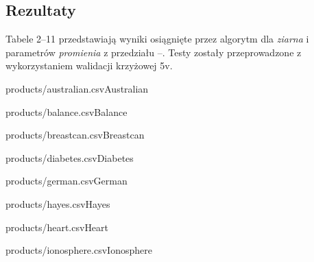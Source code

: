 \documentclass[]{article}
\begin{document}
\subsection{Rezultaty}

Tabele 2--11 przedstawiają wyniki osiągnięte przez algorytm dla \emph{ziarna}  i parametrów \emph{promienia} z przedziału --. Testy zostały przeprowadzone z wykorzystaniem walidacji krzyżowej \oldstylenums5v.

\begin{table}[htb]
    \parbox{.45\linewidth}{
	    \begin{ride}{products/australian.csv}{Australian}\end{ride}
	}
	\hfill
    \parbox{.45\linewidth}{
	    \begin{ride}{products/balance.csv}{Balance}\end{ride}
	}
\end{table}

\begin{table}[!ht]
    \parbox{.45\linewidth}{
	    \begin{ride}{products/breastcan.csv}{Breastcan}\end{ride}
	}
	\hfill
    \parbox{.45\linewidth}{
	    \begin{ride}{products/diabetes.csv}{Diabetes}\end{ride}
	}
\end{table}


\begin{table}[!ht]
    \parbox{.45\linewidth}{
	    \begin{ride}{products/german.csv}{German}\end{ride}
	}
	\hfill
    \parbox{.45\linewidth}{
	    \begin{ride}{products/hayes.csv}{Hayes}\end{ride}
	}
\end{table}

\begin{table}[!ht]
    \parbox{.45\linewidth}{
	    \begin{ride}{products/heart.csv}{Heart}\end{ride}
	}
	\hfill
    \parbox{.45\linewidth}{
	    \begin{ride}{products/ionosphere.csv}{Ionosphere}\end{ride}
	}
\end{table}
\end{document}
